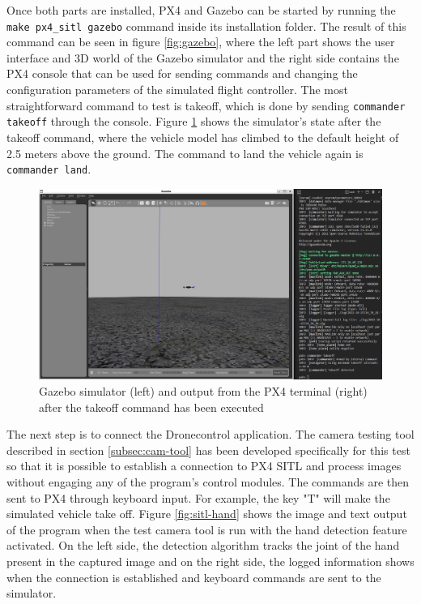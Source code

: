 Once both parts are installed, PX4 and Gazebo can be started by running the \texttt{make px4_sitl gazebo} command inside its installation folder.
The result of this command can be seen in figure \ref{fig:gazebo}, where the left part shows the user interface and 3D world of the Gazebo simulator and the right side contains the PX4 console that can be used for sending commands and changing the configuration parameters of the simulated flight controller.
The most straightforward command to test is takeoff, which is done by sending \texttt{commander takeoff} through the console.
Figure \ref{fig:gazebo-takeoff} shows the simulator's state after the takeoff command, where the vehicle model has climbed to the default height of 2.5 meters above the ground.
The command to land the vehicle again is \texttt{commander land}.

\begin{figure}
  \centering
  \includegraphics[width=.8\textwidth, keepaspectratio]{img/gazebo-takeoff.png}
  \caption{Gazebo simulator (left) and output from the PX4 terminal (right) after the takeoff command has been executed}\label{fig:gazebo-takeoff}
\end{figure}

The next step is to connect the Dronecontrol application.
The camera testing tool described in section \ref{subsec:cam-tool} has been developed specifically for this test so that it is possible to establish a connection to PX4 SITL and process images without engaging any of the program's control modules.
The commands are then sent to PX4 through keyboard input.
For example, the key "T" will make the simulated vehicle take off.
Figure \ref{fig:sitl-hand} shows the image and text output of the program when the test camera tool is run with the hand detection feature activated.
On the left side, the detection algorithm tracks the joint of the hand present in the captured image and on the right side, the logged information shows when the connection is established and keyboard commands are sent to the simulator.

